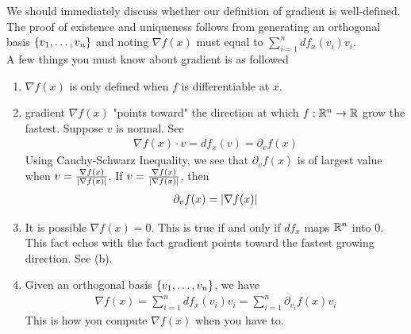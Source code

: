 \documentclass{report}
\begin{document}
\begin{mdframed}
We should immediately discuss whether our definition of gradient is well-defined. The proof of existence and uniqueness follows from generating an orthogonal basis $\{ v_1,\dots ,v_n \}$ and noting $\nabla f(x)$ must equal to $\sum_{i=1}^n df_x(v_i)v_i$.\\

A few things you must know about gradient is as followed
\begin{enumerate}[label=(\alph*)]
  \item $\nabla f(x)$ is only defined when $f$ is differentiable at  $x$.
  \item gradient $\nabla f(x)$ "points toward" the direction at which $f:\mathbb{R}^n\rightarrow \mathbb{R}$ grow the fastest. Suppose $v$ is normal. See 
\begin{align*}
\nabla f(x)\cdot v = df_x(v)=\partial_v f(x)
\end{align*}
Using Cauchy-Schwarz Inequality, we see that $\partial_v f(x)$ is of largest value when $v=\frac{\nabla f(x)}{\left|\nabla f(x)\right|}$. If $v=\frac{\nabla f(x)}{\left|\nabla f(x)\right|}$, then 
\begin{align*}
\partial_v f(x)=\left|\nabla f(x)\right|
\end{align*}
\item It is possible $\nabla f(x)=0$. This is true if and only if $df_x$ maps  $\mathbb{R}^n$ into $0$. This fact echos with the fact gradient points toward the fastest growing direction. See (b).  
\item Given an orthogonal basis $\{ v_1,\dots ,v_n \}$, we have
  \begin{align*}
  \nabla f(x)=\sum_{i=1}^n df_x (v_i)v_i=\sum_{i=1}^n \partial_{v_i}f(x)v_i
  \end{align*}
This is how you compute $\nabla f(x)$ when you have to.
\end{enumerate}
\end{mdframed}
\end{document}

